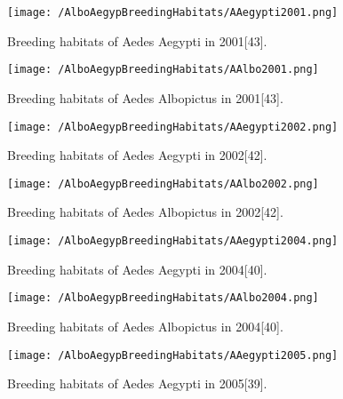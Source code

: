 \documentclass[11pt]{exam}
\begin{document}
\begin{questions}
\begin{enumerate}
\newpage
\begin{figure}[H]
  \centering
   \texttt{[image: /AlboAegypBreedingHabitats/AAegypti2001.png]} 
  \caption{Breeding habitats of Aedes Aegypti in 2001[43].}
   \label{Breeding habitats of Aedes mosquitoes}
\end{figure} 

\begin{figure}[H]
  \centering
   \texttt{[image: /AlboAegypBreedingHabitats/AAlbo2001.png]} 
  \caption{Breeding habitats of Aedes Albopictus in 2001[43].}
   \label{Breeding habitats of Aedes mosquitoes}
\end{figure} 

\newpage
\begin{figure}[H]
  \centering
   \texttt{[image: /AlboAegypBreedingHabitats/AAegypti2002.png]} 
  \caption{Breeding habitats of Aedes Aegypti in 2002[42].}
   \label{Breeding habitats of Aedes mosquitoes}
\end{figure} 

\begin{figure}[H]
  \centering
   \texttt{[image: /AlboAegypBreedingHabitats/AAlbo2002.png]} 
  \caption{Breeding habitats of Aedes Albopictus in 2002[42].}
   \label{Breeding habitats of Aedes mosquitoes}
\end{figure} 

\newpage
\begin{figure}[H]
  \centering
   \texttt{[image: /AlboAegypBreedingHabitats/AAegypti2004.png]} 
  \caption{Breeding habitats of Aedes Aegypti in 2004[40].}
   \label{Breeding habitats of Aedes mosquitoes}
\end{figure} 

\begin{figure}[H]
  \centering
   \texttt{[image: /AlboAegypBreedingHabitats/AAlbo2004.png]} 
  \caption{Breeding habitats of Aedes Albopictus in 2004[40].}
   \label{Breeding habitats of Aedes mosquitoes}
\end{figure} 

\newpage
\begin{figure}[H]
  \centering
   \texttt{[image: /AlboAegypBreedingHabitats/AAegypti2005.png]} 
  \caption{Breeding habitats of Aedes Aegypti in 2005[39].}
   \label{Breeding habitats of Aedes mosquitoes}
\end{figure} 


\end{enumerate}
\end{questions}
\end{document}

